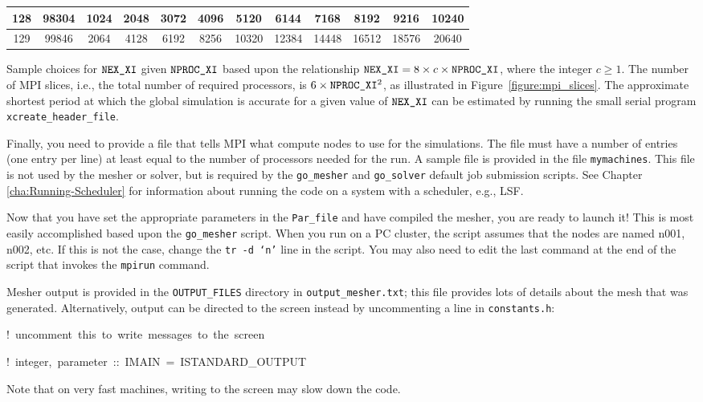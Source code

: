\documentclass[oneside,english]{book}
\providecommand{\tabularnewline}{\\}
\newenvironment{lyxcode}
{\begin{list}{}{
\setlength{\rightmargin}{\leftmargin}
\setlength{\listparindent}{0pt}%
\raggedright
\setlength{\itemsep}{0pt}
\setlength{\parsep}{0pt}
\normalfont\ttfamily}%
 \item[]}
{\end{list}}
\newcommand{\nexxi}{\mbox{\texttt{NEX\_XI}}}
\newcommand{\nprocxi}{\mbox{\texttt{NPROC\_XI}}}
\begin{document}
\begin{center}
\begin{longtable}{|c|c|c|c|c|c|c|c|c|c|c|c|}
\hline
128 & 98304 & 1024 & 2048 & 3072 & 4096 & 5120 & 6144 & 7168 & 8192 & 9216 & 10240\tabularnewline
\hline
129 & 99846 & 2064 & 4128 & 6192 & 8256 & 10320 & 12384 & 14448 & 16512 & 18576 & 20640\tabularnewline
\hline
\end{longtable}
%
\begin{table}[h]
\caption{Sample choices for $\nexxi$ given $\nprocxi$ based upon the relationship
$\nexxi=8\times c\times\nprocxi$, where the integer $c\ge1$. The
number of MPI slices, i.e., the total number of required processors,
is $6\times\nprocxi^{2}$, as illustrated in Figure~\ref{figure:mpi_slices}.
The approximate shortest period at which the global simulation is
accurate for a given value of $\nexxi$ can be estimated by running
the small serial program \texttt{xcreate\_header\_file}.}
\end{table}
\end{center}

Finally, you need to provide a file that tells MPI what compute nodes
to use for the simulations. The file must have a number of entries
(one entry per line) at least equal to the number of processors needed
for the run. A sample file is provided in the file \texttt{mymachines}.
This file is not used by the mesher or solver, but is required by
the \texttt{go\_mesher} and \texttt{go\_solver} default job submission
scripts. See Chapter \ref{cha:Running-Scheduler} for information
about running the code on a system with a scheduler, e.g., LSF.

Now that you have set the appropriate parameters in the \texttt{Par\_file}
and have compiled the mesher, you are ready to launch it! This is
most easily accomplished based upon the \texttt{go\_mesher} script.
When you run on a PC cluster, the script assumes that the nodes are
named n001, n002, etc. If this is not the case, change the \texttt{tr
-d `n'} line in the script. You may also need to edit the last command
at the end of the script that invokes the \texttt{mpirun} command.

Mesher output is provided in the \texttt{OUTPUT\_FILES} directory
in \texttt{output\_mesher.txt}; this file provides lots of details
about the mesh that was generated. Alternatively, output can be directed
to the screen instead by uncommenting a line in \texttt{constants.h}:

\begin{lyxcode}
!~uncomment~this~to~write~messages~to~the~screen~

!~integer,~parameter~::~IMAIN~=~ISTANDARD\_OUTPUT~~
\end{lyxcode}
Note that on very fast machines, writing to the screen may slow down
the code.
\end{document}
